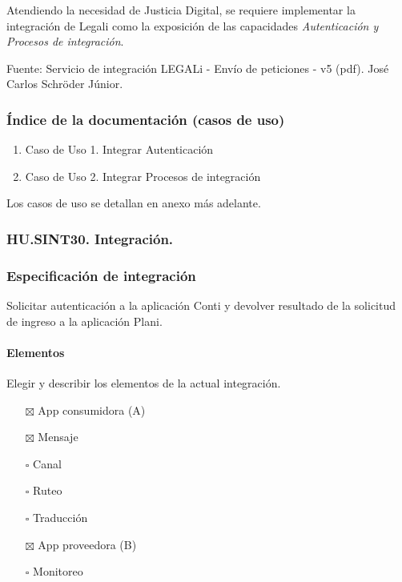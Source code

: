 \documentclass[
  paper=a4,
  ,captions=tableheading
]{scrartcl}
\providecommand{\tightlist}{%
  \setlength{\itemsep}{0pt}\setlength{\parskip}{0pt}}
\begin{document}
Atendiendo la necesidad de Justicia Digital, se requiere implementar la
integración de Legali como la exposición de las capacidades
\emph{Autenticación y Procesos de integración}.

Fuente: Servicio de integración LEGALi - Envío de peticiones - v5 (pdf).
José Carlos Schröder Júnior.

\subsubsection{Índice de la documentación (casos de
uso)}\label{sec:uxedndice-de-la-documentaciuxf3n-casos-de-uso-1}

\begin{enumerate}
\def\labelenumi{\arabic{enumi}.}
\tightlist
\item
  Caso de Uso 1. Integrar Autenticación
\item
  Caso de Uso 2. Integrar Procesos de integración
\end{enumerate}

Los casos de uso se detallan en anexo más adelante.

\subsubsection{HU.SINT30.
Integración.}\label{sec:hu.sint30.-integraciuxf3n.}

\subsubsection{Especificación de
integración}\label{sec:especificaciuxf3n-de-integraciuxf3n}

Solicitar autenticación a la aplicación Conti y devolver resultado de la
solicitud de ingreso a la aplicación Plani.

\paragraph{Elementos}\label{sec:elementos}

Elegir y describir los elementos de la actual integración.

\begin{itemize}
\tightlist
\item[$\boxtimes$]
  App consumidora (A)
\item[$\boxtimes$]
  Mensaje
\item[$\square$]
  Canal
\item[$\square$]
  Ruteo
\item[$\square$]
  Traducción
\item[$\boxtimes$]
  App proveedora (B)
\item[$\square$]
  Monitoreo
\end{itemize}
\end{document}

